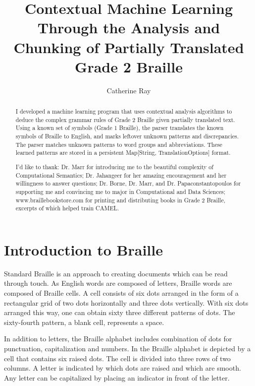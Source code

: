 \documentclass[26pt]{article}
\title{Contextual Machine Learning Through the Analysis and Chunking of Partially Translated Grade 2 Braille}
\author{Catherine Ray}
\date{}
\begin{document}
  \maketitle

\pagestyle{fancy}
\renewcommand{\sectionmark}[1]{\markright{\thesection\ #1}}
\fancyhf{}
\lhead{\fancyplain{}{\rightmark }} 
\cfoot{\fancyplain{}{\thepage}}
 
\begin{abstract}
I developed a machine learning program that uses contextual analysis algorithms to deduce the complex grammar rules of Grade 2 Braille given partially translated text. Using a known set of symbols (Grade 1 Braille), the parser translates the known symbols of Braille to English, and marks leftover unknown patterns and discrepancies. The parser matches unknown patterns to word groups and abbreviations. These learned patterns are stored in a persistent Map[String, TranslationOptions] format. 
\end{abstract}
\clearpage
\renewcommand{\abstractname}{Acknowledgements}
\begin{abstract}
I'd like to thank: Dr. Marr for introducing me to the beautiful complexity of Computational Semantics; Dr. Jahangeer for her amazing encouragement and her willingness to answer questions; Dr. Borne, Dr. Marr, and Dr. Papaconstantopoulos for supporting me and convincing me to major in Computational and Data Sciences; www.braillebookstore.com for printing and distributing books in Grade 2 Braille, excerpts of which helped train CAMEL.
\end{abstract}
\clearpage
\tableofcontents
\clearpage


\section{Introduction to Braille}


Standard Braille is an approach to creating documents which can be read through touch. As English words are composed of letters, Braille words are composed of Braille cells. A cell consists of six dots arranged in the form of a rectangular grid of two dots horizontally and three dots vertically. With six dots arranged this way, one can obtain sixty three different patterns of dots. The sixty-fourth pattern, a blank cell, represents a space. 

In addition to letters, the Braille alphabet includes combination of dots for punctuation, capitalization and numbers. In the Braille alphabet is depicted by a cell that contains six raised dots. The cell is divided into three rows of two columns. A letter is indicated by which dots are raised and which are smooth. Any letter can be capitalized by placing an indicator in front of the letter.
\end{document}
